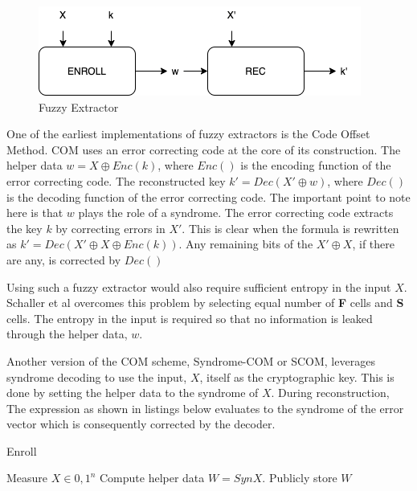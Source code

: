 \documentclass[journal, a4paper]{IEEEtran}
\begin{document}
\begin{figure}[!hbt]
    \begin{center}
    \includegraphics[scale=0.45]{figs/COM.png}
    \caption{Fuzzy Extractor}
    \label{fig:tf_plot}
    \end{center}
\end{figure}

One of the earliest implementations of fuzzy extractors is the Code Offset Method. \cite{COM} COM uses an error correcting code at the core of its construction. The helper data \(w = X \oplus Enc(k)\), where \(Enc()\) is the encoding function of the error correcting code. The reconstructed key \(k' = Dec(X' \oplus w)\), where \(Dec()\) is the decoding function of the error correcting code. The important point to note here is that \(w\) plays the role of a syndrome. The error correcting code extracts the key \(k\) by correcting errors in \(X'\). This is clear when the formula is rewritten as \(k' = Dec(X' \oplus X \oplus Enc(k))\). Any remaining bits of the \(X' \oplus X\), if there are any, is corrected by \(Dec()\)

Using such a fuzzy extractor would also require sufficient entropy in the input \(X\). Schaller et al overcomes this problem by selecting equal number of \textbf{F} cells and \textbf{S} cells. The entropy in the input is required so that no information is leaked through the helper data, \(w\).

Another version of the COM scheme, Syndrome-COM or SCOM,\cite{COM} leverages syndrome decoding to use the input, \(X\), itself as the cryptographic key. This is done by setting the helper data to the syndrome of \(X\). During reconstruction, The expression as shown in listings below evaluates to the syndrome of the error vector which is consequently corrected by the decoder.

\begin{algorithm}
\caption{Enroll}
\begin{algorithmic}[1]
    \STATE Measure \(X \in {0,1}^{n}\)
    \STATE Compute helper data \(W = SynX\).
    \STATE Publicly store \(W\)
\end{algorithmic}
\end{algorithm}
\end{document}

